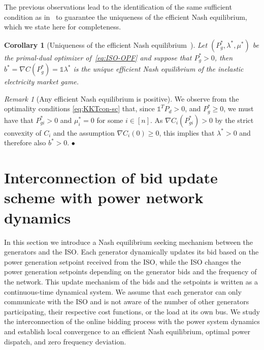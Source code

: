 \documentclass[journal]{IEEEtran}
\newcommand{\1}{\mathds 1}
\newcommand{\until}[1]{[#1]}
\newcommand{\oprocendsymbol}{\hbox{$\bullet$}}
\newcommand{\oprocend}{\relax\ifmmode\else\unskip\hfill\fi\oprocendsymbol}
\renewcommand{\l}{\lambda}
\newtheorem{corollary}[theorem]{Corollary}
\theoremstyle{remark}
\newtheorem{remark}[theorem]{Remark}
\theoremstyle{definition}
\newcommand{\marginac}[1]{\marginpar{\color{magenta}\tiny\ttfamily#1}}
\begin{document}
The previous observations lead to the identification of the same
sufficient condition as in~\cite{cherukuri2016decentralized} to
guarantee the uniqueness of the efficient Nash equilibrium, which we
state here for completeness.

\begin{corollary}[Uniqueness of the efficient Nash
  equilibrium~\cite{cherukuri2016decentralized}]
  Let $( P_{g}^*,\l^*,\mu^*)$ be the primal-dual optimizer
  of~\eqref{eq:ISO-OPF}
  and suppose that $P_g^*>0$, then $b^*=\nabla C(P_g^*)=\1\l^*$ is the
  unique efficient Nash equilibrium of the inelastic electricity
  market game.
\end{corollary}

\begin{remark}[Any efficient Nash equilibrium is
  positive]\label{rem:pos-eff-NE}
  We observe from the optimality conditions \eqref{eq:KKTcon-sc} that,
  since $\1^TP_d>0$, and $P_g^*\geq0$, we must have that
  $P_{gi}^*>0$ and $\mu_i^*=0$ for some $i\in\until{n}$. As $\nabla
  C_i(P_{gi}^*)>0$ by the strict convexity of $C_i$ and the assumption
  $\nabla C_i(0)\ge0$, this implies that $\l^*>0$ and therefore also
  $b^*>0$. \oprocend
\end{remark}

\section{Interconnection of bid update scheme with power network
  dynamics}\label{sec:continuous-real-time}

In this section we introduce a Nash equilibrium seeking mechanism
between the generators and the ISO. Each generator dynamically updates
its bid based on the power generation setpoint received from the ISO,
while the ISO changes the power generation setpoints depending on the
generator bids and the frequency of the network. This update mechanism
of the bids and the setpoints is written as a continuous-time dynamical
system. We assume that each generator can only communicate with the ISO
and is not aware of the number of other generators participating, their
respective cost functions, or the load at its own bus. We study the
interconnection of the online bidding process with the power system
dynamics and establish local convergence to an efficient Nash
equilibrium, optimal power dispatch, and zero frequency deviation. 
\end{document}
